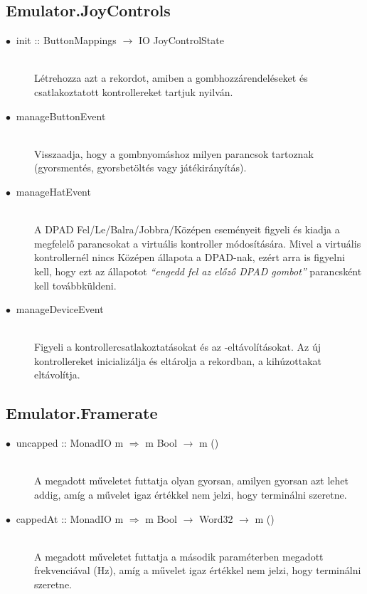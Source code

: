\subsection{Emulator.JoyControls}

\begin{description}
	\item[$\bullet\:$ init :: ButtonMappings $\rightarrow$ IO JoyControlState] \hfill \\
	Létrehozza azt a rekordot, amiben a gombhozzárendeléseket és csatlakoztatott kontrollereket tartjuk nyilván.
	\item[$\bullet\:$ manageButtonEvent] \hfill \\
	Visszaadja, hogy a gombnyomáshoz milyen parancsok tartoznak (gyorsmentés, gyorsbetöltés vagy játékirányítás). 
	\item[$\bullet\:$ manageHatEvent] \hfill \\
	A DPAD Fel/Le/Balra/Jobbra/Középen eseményeit figyeli és kiadja a megfelelő parancsokat a virtuális kontroller módosítására. Mivel a virtuális kontrollernél nincs Középen állapota a DPAD-nak, ezért arra is figyelni kell, hogy ezt az állapotot \emph{``engedd fel az előző DPAD gombot''} parancsként kell továbbküldeni.
	\item[$\bullet\:$ manageDeviceEvent] \hfill \\
	Figyeli a kontrollercsatlakoztatásokat és az -eltávolításokat.
	Az új kontrollereket inicializálja és eltárolja a rekordban, a kihúzottakat eltávolítja.
\end{description}

\subsection{Emulator.Framerate}

\begin{description}
	\item[$\bullet\:$ uncapped :: MonadIO m $\Rightarrow$ m Bool $\rightarrow$ m ()] \hfill \\
	A megadott műveletet futtatja olyan gyorsan, amilyen gyorsan azt lehet addig, amíg a művelet igaz értékkel nem jelzi, hogy terminálni szeretne.
	\item[$\bullet\:$ cappedAt :: MonadIO m $\Rightarrow$ m Bool $\rightarrow$ Word32 $\rightarrow$ m ()] \hfill \\
	A megadott műveletet futtatja a második paraméterben megadott frekvenciával (Hz), amíg a művelet igaz értékkel nem jelzi, hogy terminálni szeretne.
\end{description}

